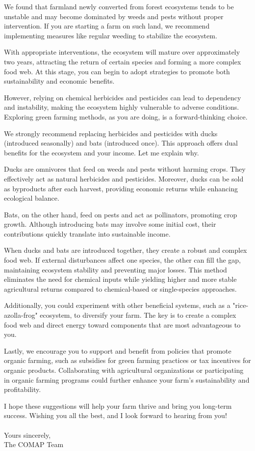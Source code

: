 \documentclass{HZNUMCM}
\begin{document}
We found that farmland newly converted from forest ecosystems tends to be unstable and may become dominated by weeds and pests without proper intervention. 
If you are starting a farm on such land, we recommend implementing measures like regular weeding to stabilize the ecosystem.  

With appropriate interventions, the ecosystem will mature over approximately two years, 
attracting the return of certain species and forming a more complex food web. 
At this stage, you can begin to adopt strategies to promote both sustainability and economic benefits.

However, relying on chemical herbicides and pesticides can lead to dependency and instability, 
making the ecosystem highly vulnerable to adverse conditions. 
Exploring green farming methods, as you are doing, is a forward-thinking choice.  

We strongly recommend replacing herbicides and pesticides with ducks (introduced seasonally) and bats (introduced once). 
This approach offers dual benefits for the ecosystem and your income. Let me explain why.

Ducks are omnivores that feed on weeds and pests without harming crops. 
They effectively act as natural herbicides and pesticides. 
Moreover, ducks can be sold as byproducts after each harvest, providing economic returns while enhancing ecological balance.

Bats, on the other hand, feed on pests and act as pollinators, promoting crop growth. 
Although introducing bats may involve some initial cost, their contributions quickly translate into sustainable income.

When ducks and bats are introduced together, they create a robust and complex food web. 
If external disturbances affect one species, the other can fill the gap, maintaining ecosystem stability and preventing major losses. 
This method eliminates the need for chemical inputs while yielding higher and more stable agricultural returns compared to chemical-based or single-species approaches.

Additionally, you could experiment with other beneficial systems, 
such as a "rice-azolla-frog" ecosystem, to diversify your farm. 
The key is to create a complex food web and direct energy toward components that are most advantageous to you.

Lastly, we encourage you to support and benefit from policies that promote organic farming, 
such as subsidies for green farming practices or tax incentives for organic products. 
Collaborating with agricultural organizations or participating in organic farming programs could further enhance your farm's sustainability and profitability.

I hope these suggestions will help your farm thrive and bring you long-term success. 
Wishing you all the best, and I look forward to hearing from you!
\\
\\
Yours sincerely,\\  
The COMAP Team
\end{document}
